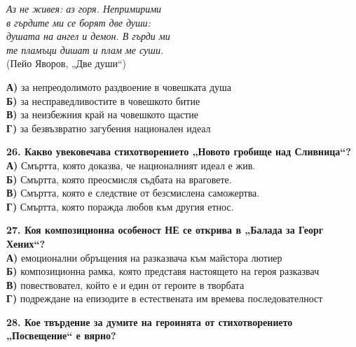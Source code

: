 \documentclass[12pt,a4paper]{article}
\begin{document}
\vspace{0.5cm}

\noindent
\textit{Аз не живея: аз горя. Непримирими\\
в гърдите ми се борят две души:\\
душата на ангел и демон. В гърди ми\\
те пламъци дишат и плам ме суши.} \\
\quad (Пейо Яворов, „Две души“)

\vspace{0.4cm}

\noindent
\textbf{А)} за непреодолимото раздвоение в човешката душа\\
\noindent
\textbf{Б)} за несправедливостите в човешкото битие\\
\noindent
\textbf{В)} за неизбежния край на човешкото щастие\\
\noindent
\textbf{Г)} за безвъзвратно загубения национален идеал

\vspace{0.6cm}

\noindent
\textbf{26. Какво увековечава стихотворението „Новото гробище над Сливница“?}
\\
\noindent
\textbf{А)} Смъртта, която доказва, че националният идеал е жив.
\\
\noindent
\textbf{Б)} Смъртта, която преосмисля съдбата на враговете.
\\
\noindent
\textbf{В)} Смъртта, която е следствие от безсмислена саможертва.
\\
\noindent
\textbf{Г)} Смъртта, която поражда любов към другия етнос.

\vspace{0.6cm}

\noindent
\textbf{27. Коя композиционна особеност НЕ се открива в „Балада за Георг Хених“?}
\\
\noindent
\textbf{А)} емоционални обръщения на разказвача към майстора лютиер
\\
\noindent
\textbf{Б)} композиционна рамка, която представя настоящето на героя разказвач
\\
\noindent
\textbf{В)} повествовател, който е и един от героите в творбата
\\
\noindent
\textbf{Г)} подреждане на епизодите в естествената им времева последователност

\vspace{0.6cm}

\noindent
\textbf{28. Кое твърдение за думите на героинята от стихотворението „Посвещение“ е вярно?}
\end{document}

